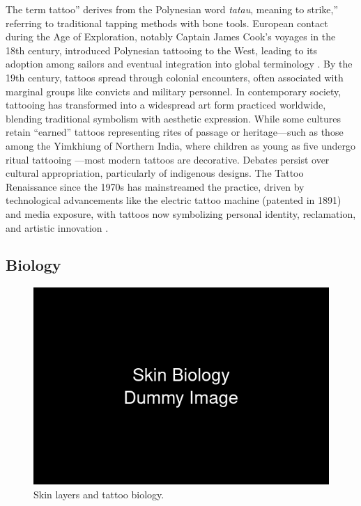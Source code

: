 \documentclass[11pt]{article}
\begin{document}
The term tattoo'' derives from the Polynesian word \textit{tatau}, meaning to strike,'' referring to traditional tapping methods with bone tools. European contact during the Age of Exploration, notably Captain James Cook's voyages in the 18th century, introduced Polynesian tattooing to the West, leading to its adoption among sailors and eventual integration into global terminology \cite{friedman2014cook}. By the 19th century, tattoos spread through colonial encounters, often associated with marginal groups like convicts and military personnel.
In contemporary society, tattooing has transformed into a widespread art form practiced worldwide, blending traditional symbolism with aesthetic expression. While some cultures retain ``earned'' tattoos representing rites of passage or heritage---such as those among the Yimkhiung of Northern India, where children as young as five undergo ritual tattooing \cite{kluger2015cultural}---most modern tattoos are decorative. Debates persist over cultural appropriation, particularly of indigenous designs. The Tattoo Renaissance since the 1970s has mainstreamed the practice, driven by technological advancements like the electric tattoo machine (patented in 1891) and media exposure, with tattoos now symbolizing personal identity, reclamation, and artistic innovation \cite{schildkrout2004inscribing,roberts2012secret}.

\subsection{Biology}

\begin{figure}
    \vspace{-20pt}
    \includegraphics[width=\linewidth]{figures/biology.png}
    \caption{Skin layers and tattoo biology.}
    \label{fig:biology_wrap}
\end{figure}
\end{document}
